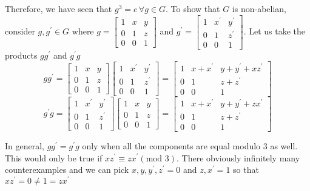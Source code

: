 \documentclass[12pt,letterpaper,reqno]{amsart}
\begin{document}
\begin{enumerate}
\begin{flushleft}
Therefore, we have seen that $g^3 = e\, \forall g \in G$. To show that $G$ is non-abelian, consider $g, g^\prime \in G$ where $g = \begin{bmatrix} 1 & x & y \\0 & 1 & z\\ 0 & 0 & 1 \end{bmatrix}$ and $g^\prime = \begin{bmatrix} 1 & x^\prime & y^\prime \\0 & 1 & z^\prime\\ 0 & 0 & 1 \end{bmatrix}$. Let us take the products $gg^\prime$ and $g^\prime g$
\newline
$$gg^\prime = \begin{bmatrix} 1 & x & y \\0 & 1 & z\\ 0 & 0 & 1 \end{bmatrix}\begin{bmatrix} 1 & x^\prime & y^\prime \\0 & 1 & z^\prime\\ 0 & 0 & 1 \end{bmatrix} = \begin{bmatrix} 1 & x+x^\prime & y+y^\prime+xz^\prime \\0 & 1 & z+z^\prime\\ 0 & 0 & 1 \end{bmatrix}$$
$$g^\prime g= \begin{bmatrix} 1 & x^\prime & y^\prime \\0 & 1 & z^\prime\\ 0 & 0 & 1 \end{bmatrix}\begin{bmatrix} 1 & x & y \\0 & 1 & z\\ 0 & 0 & 1 \end{bmatrix} = \begin{bmatrix} 1 & x+x^\prime & y+y^\prime+zx^\prime \\0 & 1 & z+z^\prime\\ 0 & 0 & 1 \end{bmatrix}$$
\newline

In general, $gg^\prime = g^\prime g$ only when all the components are equal modulo 3 as well. This would only be true if $xz^\prime \equiv zx^\prime (\text{mod }3)$. There obviously infinitely many counterexamples and we can pick $x, y, y^\prime, z^\prime = 0$ and $z, x^\prime = 1$ so that $xz^\prime = 0 \not= 1 = zx^\prime$
\newline


\end{flushleft}
\end{enumerate}
\end{document}

